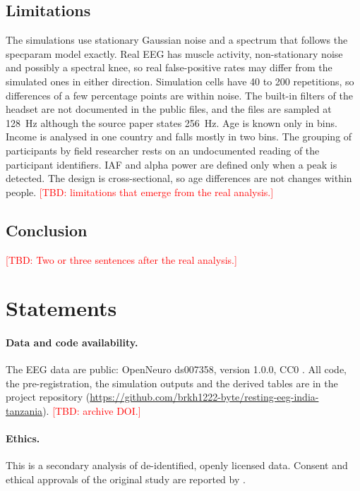 \documentclass[11pt,a4paper]{article}
\newcommand{\TBD}[1]{\textcolor{red}{[TBD: #1]}}
\begin{document}
\subsection{Limitations}

The simulations use stationary Gaussian noise and a spectrum that follows the specparam
model exactly. Real EEG has muscle activity, non-stationary noise and possibly a spectral
knee, so real false-positive rates may differ from the simulated ones in either direction.
Simulation cells have 40 to 200 repetitions, so differences of a few percentage points are
within noise. The built-in filters of the headset are not documented in the public files,
and the files are sampled at 128~Hz although the source paper states 256~Hz. Age is known
only in bins. Income is analysed in one country and falls mostly in two bins. The grouping
of participants by field researcher rests on an undocumented reading of the participant
identifiers. IAF and alpha power are defined only when a peak is detected. The design is
cross-sectional, so age differences are not changes within people. \TBD{limitations that
emerge from the real analysis.}

\subsection{Conclusion}
\TBD{Two or three sentences after the real analysis.}

\section*{Statements}

\paragraph{Data and code availability.} The EEG data are public: OpenNeuro ds007358,
version 1.0.0, CC0 \citep{openneuro_ds007358}. All code, the pre-registration, the
simulation outputs and the derived tables are in the project repository
(\url{https://github.com/brkh1222-byte/resting-eeg-india-tanzania}). \TBD{archive DOI.}

\paragraph{Ethics.} This is a secondary analysis of de-identified, openly licensed data.
Consent and ethical approvals of the original study are reported by \citet{vianney2025}.
\end{document}

